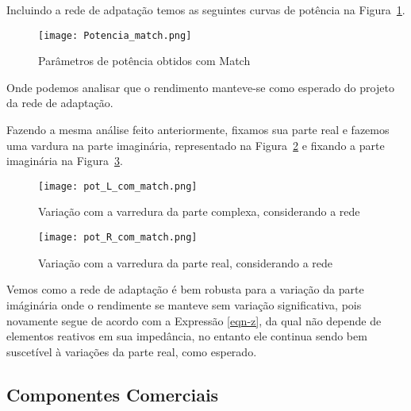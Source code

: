 \documentclass[a4paper,12pt]{proc}
\begin{document}
\singlespacing

\begin{comment}

\noindent Quando variamos a parte imaginária, a varição da eficiência segue a Equação \ref{eqn-z} onde a parte imaginária das impedância ainde tem influência, no entando, não tanto quanto a parte real.
\end{comment}


\noindent Incluindo a rede de adpatação temos as seguintes curvas de potência na Figura~\ref{pot_match}.

\singlespacing

\begin{figure}[htbp]
    \centering
    \texttt{[image: Potencia\_match.png]}
    \caption{Parâmetros de potência obtidos com Match}
    \label{pot_match}
\end{figure}

\noindent Onde podemos analisar que o rendimento manteve-se como esperado do projeto da rede de adaptação.

\singlespacing

\noindent Fazendo a mesma análise feito anteriormente, fixamos sua parte real e fazemos uma vardura na parte imaginária, representado na Figura~\ref{pot_l_com} e fixando a parte imaginária na Figura~\ref{pot_r_com}.

\begin{figure}[htbp]
    \centering
    \texttt{[image: pot\_L\_com\_match.png]}
    \caption{Variação com a varredura da parte complexa, considerando a rede}
    \label{pot_l_com}
\end{figure}

\begin{figure}[htbp]
    \centering
    \texttt{[image: pot\_R\_com\_match.png]}
    \caption{Variação com a varredura da parte real, considerando a rede}
    \label{pot_r_com}
\end{figure}

\noindent Vemos como a rede de adaptação é bem robusta para a variação da parte imáginária onde o rendimente se manteve sem variação significativa, pois novamente segue de acordo com a Expressão \ref{eqn-z}, da qual não depende de elementos reativos em sua impedância, no entanto ele continua sendo bem suscetível à variações da parte real, como esperado.


\subsection{Componentes Comerciais}
\end{document}
